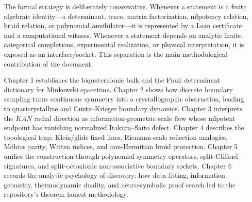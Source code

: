 \documentclass[12pt,a4paper]{book}
\begin{document}
The formal strategy is deliberately conservative.  Whenever a statement is a finite algebraic identity---a determinant, trace, matrix factorization, nilpotency relation, braid relation, or polynomial annihilator---it is represented by a Lean certificate and a computational witness.  Whenever a statement depends on analytic limits, categorical completions, experimental realization, or physical interpretation, it is exposed as an interface/socket.  This separation is the main methodological contribution of the document.

Chapter 1 establishes the biquaternionic bulk and the Pauli determinant dictionary for Minkowski spacetime.  Chapter 2 shows how discrete boundary sampling turns continuous symmetry into a crystallographic obstruction, leading to quasicrystalline and Cuntz--Krieger boundary dynamics.  Chapter 3 interprets the $KAN$ radial direction as information-geometric scale flow whose nilpotent endpoint has vanishing normalized Itakura--Saito defect.  Chapter 4 describes the topological trap: Klein/glide fixed lines, Riemann-scale reflection analogies, Möbius parity, Witten indices, and non-Hermitian braid protection.  Chapter 5 unifies the construction through polynomial symmetry operators, split-Clifford signatures, and split-octonionic non-associative boundary sockets.  Chapter 6 records the analytic psychology of discovery: how data fitting, information geometry, thermodynamic duality, and neuro-symbolic proof search led to the repository's theorem-honest methodology.

\tableofcontents








\nocite{*}


\end{document}
